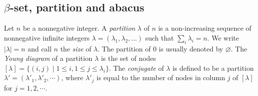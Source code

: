 \documentclass[11pt]{amsart}
\theoremstyle{plain}
\numberwithin{equation}{subsection}
\newtheorem{lemma}[theorem]{Lemma}
\newtheorem{definition}[theorem]{Definition}
\newcommand{\lam}{\lambda}
\def\bs{{\mathbf s}}
\def\blam{{\boldsymbol \lambda}}
\def\bmu{{\boldsymbol \mu}}
\def\bs{{\bf s}}
\def\bu{{\bf u}}
\begin{document}

\smallskip

\subsection{$\beta$-set, partition and abacus}
Let $n$ be a nonnegative integer. A {\em partition} $\lam$ of $n$ is a non-increasing sequence of
nonnegative infinite integers $\lam=(\lam_1,\lam_2,\dots)$ such that
$\sum_{i}\lam_i=n$. We write $|\lam|=n$ and call $n$ the {\em size} of $\lam$. 
The partition of 0 is usually denoted by $\varnothing$.
The {\em Young diagram} of a
partition $\lam$ is the set of nodes $[\lam]=\{(i,j)\mid 1\leq i,
1\leq j\leq\lam_{i}\}$.
The {\em conjugate} of $\lam$ is defined to be a partition
$\lam'=(\lam'_1,\lam'_2,\cdots)$, where $\lam'_j$ is equal to the
number of nodes in column $j$ of $[\lam]$ for $j=1,2,\cdots$.
\end{document}
